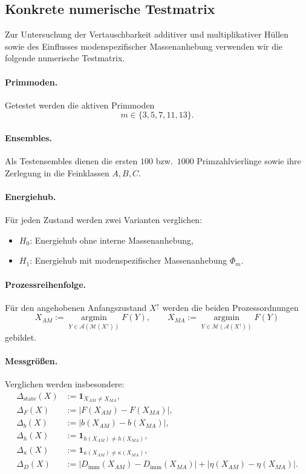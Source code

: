 \documentclass[11pt,a4paper]{article}
\theoremstyle{definition}
\begin{document}
\subsection{Konkrete numerische Testmatrix}

Zur Untersuchung der Vertauschbarkeit additiver und multiplikativer Hüllen sowie des Einflusses modenspezifischer Massenanhebung verwenden wir die folgende numerische Testmatrix.

\paragraph{Primmoden.}
Getestet werden die aktiven Primmoden
\[
m\in\{3,5,7,11,13\}.
\]

\paragraph{Ensembles.}
Als Testensembles dienen die ersten \(100\) bzw.\ \(1000\) Primzahlvierlinge sowie ihre Zerlegung in die Feinklassen \(A,B,C\).

\paragraph{Energiehub.}
Für jeden Zustand werden zwei Varianten verglichen:
\begin{itemize}
	\item \(H_0\): Energiehub ohne interne Massenanhebung,
	\item \(H_1\): Energiehub mit modenspezifischer Massenanhebung \(\Phi_m\).
\end{itemize}

\paragraph{Prozessreihenfolge.}
Für den angehobenen Anfangszustand \(X^\uparrow\) werden die beiden Prozessordnungen
\[
X_{AM}:=\operatorname*{argmin}_{Y\in \mathcal A(\mathcal M(X^\uparrow))}F(Y),
\qquad
X_{MA}:=\operatorname*{argmin}_{Y\in \mathcal M(\mathcal A(X^\uparrow))}F(Y)
\]
gebildet.

\paragraph{Messgrößen.}
Verglichen werden insbesondere:
\begin{align*}
	\Delta_{\mathrm{state}}(X)&:=\mathbf 1_{X_{AM}\neq X_{MA}},\\
	\Delta_F(X)&:=|F(X_{AM})-F(X_{MA})|,\\
	\Delta_b(X)&:=|b(X_{AM})-b(X_{MA})|,\\
	\Delta_h(X)&:=\mathbf 1_{h(X_{AM})\neq h(X_{MA})},\\
	\Delta_\kappa(X)&:=\mathbf 1_{\kappa(X_{AM})\neq \kappa(X_{MA})},\\
	\Delta_D(X)&:=|D_{\mathrm{imm}}(X_{AM})-D_{\mathrm{imm}}(X_{MA})|+|\eta(X_{AM})-\eta(X_{MA})|.
\end{align*}
\end{document}
